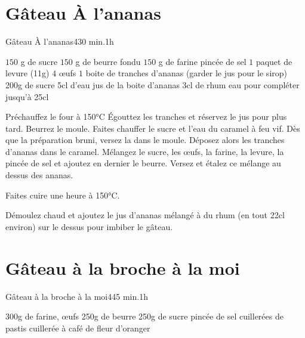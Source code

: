 {\section{Gâteau À l'ananas}
\begin{recette}{Gâteau À l'ananas}{4}{30 min.}{1h}
\begin{ingredients}
\ingredient[gâteau]
\ingredient $150$ g de sucre
\ingredient $150$ g de beurre fondu
\ingredient $150$ g de farine
 pincée de sel
\ingredient $1$ paquet de levure (11g)
\ingredient $4$ œufs
\ingredient $1$ boite de tranches d'ananas (garder le jus pour le sirop)
\ingredient[caramel]
\ingredient 200g de sucre
\ingredient 5cl d'eau
\ingredient jus de la boite d'ananas
\ingredient 3cl de rhum
\ingredient eau pour compléter jusqu'à 25cl
\end{ingredients}

\begin{preparation}
\etape Préchauffez le four à 150°C
\etape Égouttez les tranches et réservez le jus pour plus tard.
\etape Beurrez le moule. 
\etape Faites chauffer le sucre et l'eau du caramel à feu vif. Dès que la préparation bruni, versez la dans le moule. 
\etape Déposez alors les tranches d'ananas dans le caramel.
\etape Mélangez le sucre, les œufs, la farine, la levure, la pincée de sel et ajoutez en dernier le beurre.
\etape Versez et étalez ce mélange au dessus des ananas.
\end{preparation}

\begin{cuisson}
Faites cuire une heure à 150°C.

Démoulez chaud et ajoutez le jus d'ananas mélangé à du rhum (en tout 22cl environ) sur le dessus pour imbiber le gâteau.
\end{cuisson}
\end{recette}

\section{Gâteau à la broche à la moi}
\begin{recette}{Gâteau à la broche à la moi}{4}{45 min.}{1h}
\begin{ingredients}
\ingredient 300g de farine,
 œufs
\ingredient 250g de beurre
\ingredient 250g de sucre
 pincée de sel
 cuillerées de pastis
 cuillerée à café de fleur d’oranger
\end{ingredients}


\end{recette}}
